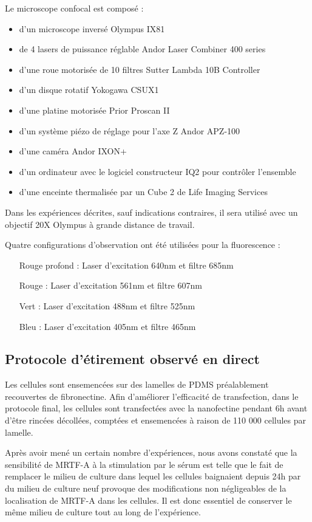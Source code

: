 \documentclass{report}
\begin{document}
	Le microscope confocal est composé : 
	\begin{itemize}
	\item d'un microscope inversé Olympus IX81
	\item de 4 lasers de puissance réglable Andor Laser Combiner 400 series
	\item d'une roue motorisée de 10 filtres Sutter Lambda 10B Controller
	\item d'un disque rotatif Yokogawa CSUX1
	\item d'une platine motorisée Prior Proscan II
	\item d'un système piézo de réglage pour l'axe Z Andor APZ-100
	\item d'une caméra Andor IXON+
	\item d'un ordinateur avec le logiciel constructeur IQ2 pour contrôler l'ensemble
	\item d'une enceinte thermalisée par un Cube 2 de Life Imaging Services
\end{itemize}	 

Dans les expériences décrites, sauf indications contraires, il sera utilisé avec un objectif 20X Olympus à grande distance de travail. 

Quatre configurations d'observation ont été utilisées pour la fluorescence : 
\begin{itemize}
\item[Rouge profond] : Laser d'excitation 640nm et filtre 685nm
\item[Rouge] : Laser d'excitation 561nm et filtre 607nm
\item[Vert] : Laser d'excitation 488nm et filtre 525nm
\item[Bleu] : Laser d'excitation 405nm et filtre 465nm
\end{itemize}
	
	\subsection{Protocole d'étirement observé en direct}
	Les cellules sont ensemencées sur des lamelles de PDMS préalablement recouvertes de fibronectine. Afin d'améliorer l'efficacité de transfection, dans le protocole final, les cellules sont transfectées avec la nanofectine pendant 6h avant d'être rincées décollées, comptées et ensemencées à raison de 110 000 cellules par lamelle. 
	
	Après avoir mené un certain nombre d'expériences, nous avons constaté que la sensibilité de MRTF-A à la stimulation par le sérum est telle que le fait de remplacer le milieu de culture dans lequel les cellules baignaient depuis 24h par du milieu de culture neuf provoque des modifications non négligeables de la localisation de MRTF-A dans les cellules. Il est donc essentiel de conserver le même milieu de culture tout au long de l'expérience. 
	
\end{document}
